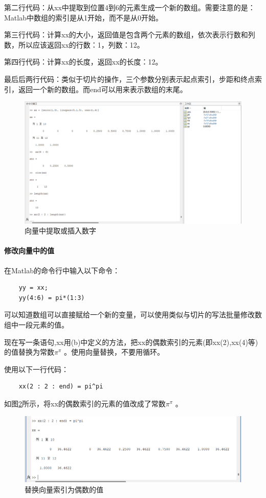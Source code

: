\documentclass[UTF8]{ctexart}
\begin{document}
第二行代码：从xx中提取到位置4到6的元素生成一个新的数组。需要注意的是：Matlab中数组的索引是从1开始，而不是从0开始。

第三行代码：计算xx的大小，返回值是包含两个元素的数组，依次表示行数和列数，所以应该返回xx的行数：1，列数：12。

第四行代码：计算xx的长度，返回xx的长度：12。

最后后两行代码：类似于切片的操作，三个参数分别表示起点索引，步距和终点索引，返回一个新的数组。而end可以用来表示数组的末尾。
\begin{figure}[htbp]
    \centering
    \includegraphics[width=0.7\linewidth]{vector.png}
    \caption{向量中提取或插入数字}
    \label{img:vector}
\end{figure}
\paragraph{修改向量中的值}
在Matlab的命令行中输入以下命令：
\begin{verbatim}
    yy = xx;
    yy(4:6) = pi*(1:3)
\end{verbatim}
可以知道数组可以直接赋给一个新的变量，可以使用类似与切片的写法批量修改数组中一段元素的值。
\begin{framed}
    现在写一条语句,xx用(b)中定义的方法，把xx的偶数索引的元素(即xx(2),xx(4)等)的值替换为常数$\pi^\pi$ 。使用向量替换，不要用循环。
\end{framed}
使用以下一行代码：
\begin{verbatim}
    xx(2 : 2 : end) = pi^pi
\end{verbatim}
如图\ref{img:even_substitution}所示，将xx的偶数索引的元素的值改成了常数$\pi^\pi$ 。
\begin{figure}[htbp]
    \centering
    \includegraphics[width=0.7\linewidth]{even_substitution.png}
    \caption{替换向量索引为偶数的值}
    \label{img:even_substitution}
\end{figure}
\end{document}
